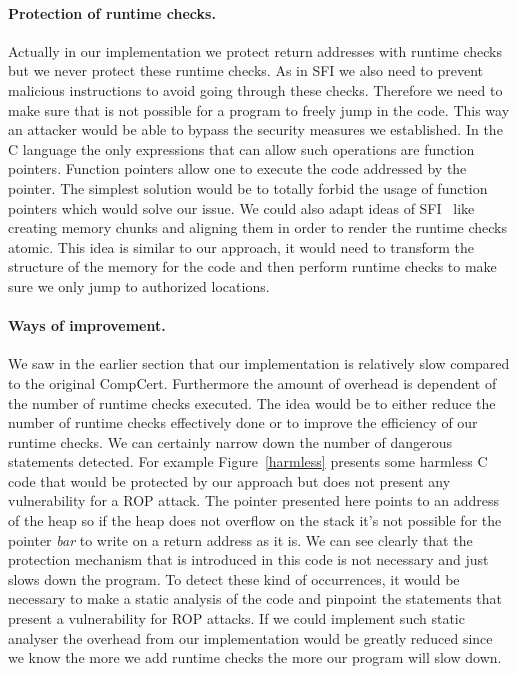 \documentclass[11pt]{sdm}
\begin{document}
\paragraph{Protection of runtime checks.}
\label{par:Protection of runtime checks}
Actually in our implementation we protect return addresses with runtime checks but we never protect these runtime checks. As in SFI we also need to prevent malicious instructions to avoid going through these checks. Therefore we need to make sure that is not possible for a program to freely jump in the code. This way an attacker would be able to bypass the security measures we established.
In the C language the only expressions that can allow such operations are function pointers. Function pointers allow one to execute the code addressed by the pointer.
The simplest solution would be to totally forbid the usage of function pointers which would solve our issue.
We could also adapt ideas of SFI~\cite{Mccamant_evaluatingsfi} like creating memory chunks and aligning them in order to render the runtime checks atomic. This idea is similar to our approach, it would need to transform the structure of the memory for the code and then perform runtime checks to make sure we only jump to authorized locations.

\paragraph{Ways of improvement.}
\label{par:improvement}
We saw in the earlier section that our implementation is relatively slow compared to the original CompCert. Furthermore the amount of overhead is dependent of the number of runtime checks executed.
The idea would be to either reduce the number of runtime checks effectively done or to improve the efficiency of our runtime checks.
We can certainly narrow down the number of dangerous statements detected. For example Figure~\ref{harmless} presents some harmless C code that would be protected by our approach but does not present any vulnerability for a ROP attack. The pointer presented here points to an address of the heap so if the heap does not overflow on the stack it's not possible for the pointer \textit{bar} to write on a return address as it is.
We can see clearly that the protection mechanism that is introduced in this code is not necessary and just slows down the program.
To detect these kind of occurrences, it would be necessary to make a static analysis of the code and pinpoint the statements that present a vulnerability for ROP attacks.
If we could implement such static analyser the overhead from our implementation would be greatly reduced since we know the more we add runtime checks the more our program will slow down.
\end{document}
